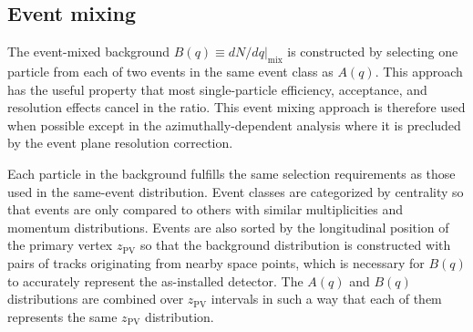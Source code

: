 \subsection{Event mixing}
\label{subsec:evt_mixing}
The event-mixed background $B(q) \equiv \left. dN/dq \right|_{\textrm{mix}}$ is constructed by selecting one particle from each of two events in the same event class as $A(q)$.
This approach has the useful property that most single-particle efficiency, acceptance, and resolution effects cancel in the ratio.
This event mixing approach is therefore used when possible except in the azimuthally-dependent analysis where it is precluded by the event plane resolution correction.

Each particle in the background fulfills the same selection requirements as those used in the same-event distribution.
Event classes are categorized by centrality so that events are only compared to others with similar multiplicities and momentum distributions.
Events are also sorted by the longitudinal position of the primary vertex $z_\textrm{PV}$ so that the background distribution is constructed with pairs of tracks originating from nearby space points, which is necessary for $B(q)$ to accurately represent the as-installed detector.
The $A(q)$ and $B(q)$ distributions are combined over $z_\textrm{PV}$ intervals in such a way that each of them represents the same $z_\textrm{PV}$ distribution.

